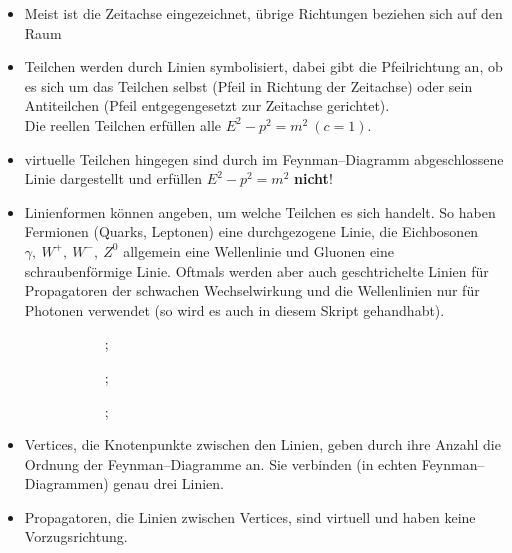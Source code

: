 \documentclass[Ex4_Zusammenfassung.tex]{subfiles}
\begin{document}
	\begin{itemize}
		\item Meist ist die Zeitachse eingezeichnet, übrige Richtungen beziehen sich auf den Raum
		
		\item Teilchen werden durch Linien symbolisiert, dabei gibt die Pfeilrichtung an, ob es sich um das Teilchen selbst 	(Pfeil in Richtung der Zeitachse) oder sein Antiteilchen (Pfeil entgegengesetzt zur Zeitachse gerichtet).\\
		Die reellen Teilchen erfüllen alle $E^2 - p^2 = m^2\ (c=1)$. 
		
		\item virtuelle Teilchen hingegen sind durch im Feynman--Diagramm abgeschlossene Linie dargestellt und erfüllen $E^2 - p^2 = m^2$ \textbf{nicht}!
		
		\item Linienformen können angeben, um welche Teilchen es sich handelt. So haben Fermionen (Quarks, Leptonen) eine durchgezogene Linie, die Eichbosonen $\gamma,\ W^+,\ W^-,\ Z^0$ allgemein eine Wellenlinie und Gluonen eine schraubenförmige Linie. Oftmals werden aber auch geschtrichelte Linien für Propagatoren der schwachen Wechselwirkung und die Wellenlinien nur für Photonen verwendet (so wird es auch in diesem Skript gehandhabt).
		\begin{figure}[H]
			\centering
			\qquad 
			\begin{subfigure}[b]{0.3\textwidth}
				;
			\end{subfigure}
			\begin{subfigure}[b]{0.3\textwidth}
				;
			\end{subfigure}
			\begin{subfigure}[b]{0.3\textwidth}
				;
			\end{subfigure}
		\end{figure}
		
		\item Vertices, die Knotenpunkte zwischen den Linien, geben durch ihre Anzahl die Ordnung der Feynman--Diagramme an. Sie verbinden (in echten Feynman--Diagrammen) genau drei Linien. 
		
		\item Propagatoren, die Linien zwischen Vertices, sind virtuell und haben keine Vorzugsrichtung.
	\end{itemize}
	
\end{document}
